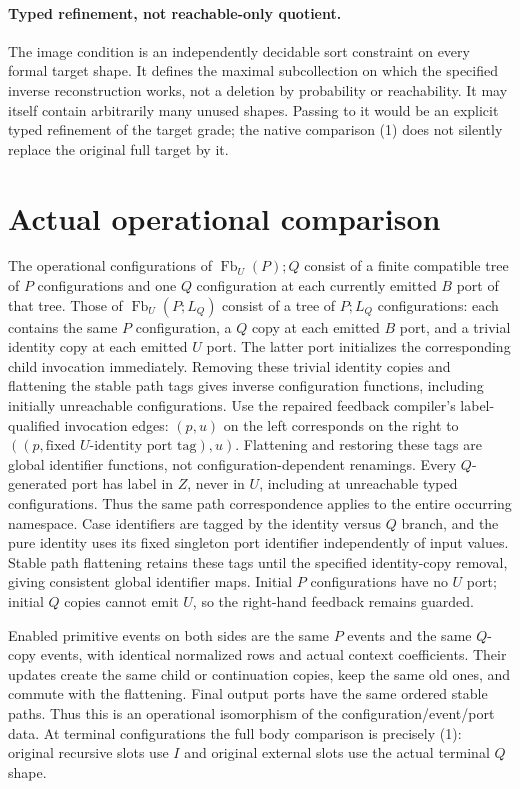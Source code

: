 \documentclass{article}
\begin{document}
\paragraph{Typed refinement, not reachable-only quotient.}
The image condition is an independently decidable sort constraint on every
formal target shape. It defines the maximal subcollection on which the
specified inverse reconstruction works, not a deletion by probability or
reachability. It may itself contain arbitrarily many unused shapes. Passing
to it would be an explicit typed refinement of the target grade; the native
comparison (1) does not silently replace the original full target by it.

\section{Actual operational comparison}
The operational configurations of $\operatorname{Fb}_U(P);Q$ consist of a
finite compatible tree of $P$ configurations and one $Q$ configuration at
each currently emitted $B$ port of that tree. Those of
$\operatorname{Fb}_U(P;L_Q)$ consist of a tree of $P;L_Q$ configurations:
each contains the same $P$ configuration, a $Q$ copy at each emitted $B$
port, and a trivial identity copy at each emitted $U$ port. The latter port
initializes the corresponding child invocation immediately. Removing these
trivial identity copies and flattening the stable path tags gives inverse
configuration functions, including initially unreachable configurations.
Use the repaired feedback compiler's label-qualified invocation edges:
$(p,u)$ on the left corresponds on the right to
$((p,\text{fixed }U\text{-identity port tag}),u)$.
Flattening and restoring these tags are global identifier functions, not
configuration-dependent renamings. Every $Q$-generated port has label in
$Z$, never in $U$, including at unreachable typed configurations. Thus the
same path correspondence applies to the entire occurring namespace.
Case identifiers are tagged by the identity versus $Q$ branch, and the
pure identity uses its fixed singleton port identifier independently of
input values. Stable path flattening retains these tags until the specified
identity-copy removal, giving consistent global identifier maps.
Initial $P$ configurations have no $U$ port; initial $Q$ copies cannot emit
$U$, so the right-hand feedback remains guarded.

Enabled primitive events on both sides are the same $P$ events and the same
$Q$-copy events, with identical normalized rows and actual context
coefficients. Their updates create the same child or continuation copies,
keep the same old ones, and commute with the flattening. Final output ports
have the same ordered stable paths. Thus this is an operational isomorphism
of the configuration/event/port data. At terminal configurations the full
body comparison is precisely (1): original recursive slots use $I$ and
original external slots use the actual terminal $Q$ shape.
\end{document}
